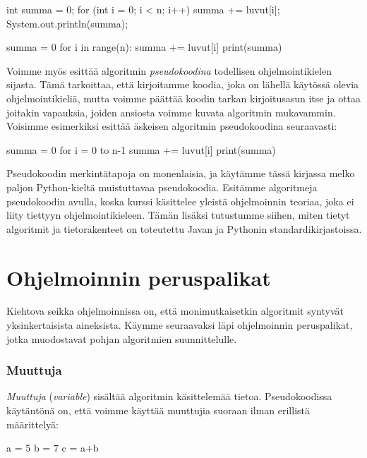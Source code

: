 \begin{code}
int summa = 0;
for (int i = 0; i < n; i++) {
    summa += luvut[i];
}
System.out.println(summa);
\end{code}

\begin{code}
summa = 0
for i in range(n):
    summa += luvut[i]
print(summa)
\end{code}


Voimme myös esittää algoritmin \emph{pseudokoodina}
todellisen ohjelmointikielen sijasta.
Tämä tarkoittaa, että kirjoitamme koodia,
joka on lähellä käytössä olevia ohjelmointikieliä, mutta voimme
päättää koodin tarkan kirjoitusasun itse ja ottaa joitakin vapauksia,
joiden ansiosta voimme kuvata algoritmin mukavammin.
Voisimme esimerkiksi esittää äskeisen algoritmin pseudokoodina seuraavasti:

\begin{code}
summa = 0
for i = 0 to n-1
    summa += luvut[i]
print(summa)
\end{code}

Pseudokoodin merkintätapoja on monenlaisia, ja
käytämme tässä kirjassa melko paljon Python-kieltä muistuttavaa pseudokoodia.
Esitämme algoritmeja pseudokoodin avulla,
koska kurssi käsittelee yleistä ohjelmoinnin teoriaa,
joka ei liity tiettyyn ohjelmointikieleen.
Tämän lisäksi tutustumme siihen, miten tietyt algoritmit
ja tietorakenteet on toteutettu Javan ja Pythonin
standardikirjastoissa.

\section{Ohjelmoinnin peruspalikat}

Kiehtova seikka ohjelmoinnissa on, että monimutkaisetkin algoritmit
syntyvät yksinkertaisista aineksista.
Käymme seuraavaksi läpi ohjelmoinnin peruspalikat,
jotka muodostavat pohjan algoritmien suunnittelulle.

\subsubsection{Muuttuja}

\emph{Muuttuja} (\emph{variable}) sisältää algoritmin
käsittelemää tietoa.
Pseudokoodissa käytäntönä on, että voimme käyttää muuttujia
suoraan ilman erillistä määrittelyä:

\begin{code}
a = 5
b = 7
c = a+b
\end{code}

